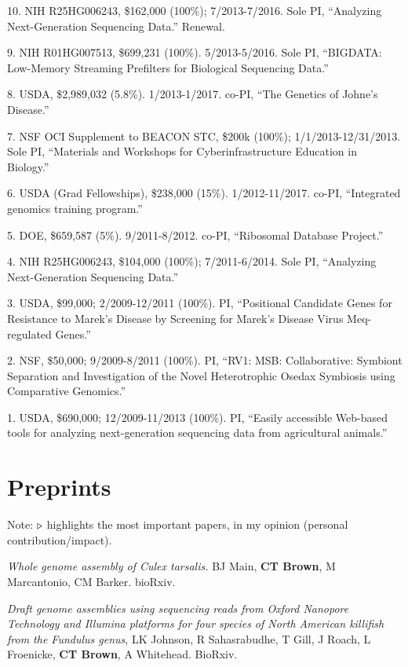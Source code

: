 \documentclass[margin,line]{resume}
\begin{document}
\begin{resume}
10. NIH R25HG006243, \$162,000 (100\%); 7/2013-7/2016.  Sole PI, ``Analyzing Next-Generation Sequencing Data.'' Renewal.

9. NIH R01HG007513, \$699,231 (100\%). 5/2013-5/2016. Sole PI, ``BIGDATA: Low-Memory Streaming Prefilters for Biological Sequencing Data.''

8. USDA, \$2,989,032 (5.8\%). 1/2013-1/2017.  co-PI, ``The Genetics of Johne's Disease.''

7. NSF OCI Supplement to BEACON STC, \$200k (100\%); 1/1/2013-12/31/2013.  Sole PI, ``Materials and Workshops for Cyberinfrastructure Education in Biology.''

6. USDA (Grad Fellowships), \$238,000 (15\%).  1/2012-11/2017.  co-PI, ``Integrated genomics training program.''

5. DOE, \$659,587 (5\%).  9/2011-8/2012.  co-PI, ``Ribosomal Database Project.''

4. NIH R25HG006243, \$104,000 (100\%); 7/2011-6/2014.  Sole PI, ``Analyzing Next-Generation Sequencing Data.''

3. USDA, \$99,000; 2/2009-12/2011 (100\%).  PI, ``Positional Candidate Genes for Resistance to Marek's
Disease by Screening for Marek's Disease Virus Meq-regulated Genes.''

2. NSF, \$50,000; 9/2009-8/2011 (100\%).  PI, ``RV1: MSB: Collaborative: Symbiont Separation and Investigation of the Novel Heterotrophic Osedax Symbiosis using Comparative Genomics.''

1. USDA, \$690,000; 12/2009-11/2013 (100\%).  PI, ``Easily accessible Web-based tools for analyzing next-generation sequencing data from agricultural animals.''


    \section{\mysidestyle Preprints}

Note: {\color{red} ${\bf \triangleright}$} highlights the most important
papers, in my opinion (personal contribution/impact).

{\em Whole genome assembly of Culex tarsalis.} BJ Main, {\bf CT Brown}, M Marcantonio, CM Barker. bioRxiv.

{\em Draft genome assemblies using sequencing reads from Oxford Nanopore Technology and Illumina platforms for four species of North American killifish from the Fundulus genus}, LK Johnson, R Sahasrabudhe, T Gill, J Roach, L Froenicke, {\bf CT Brown}, A Whitehead. BioRxiv.


\end{resume}
\end{document}
